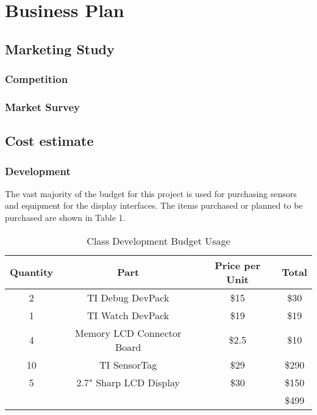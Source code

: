\documentclass[ppfs.tex]{template/subfiles}
\begin{document}
\section{Business Plan}
    \subsection{Marketing Study}
        \subsubsection{Competition}
        \subsubsection{Market Survey}
    \subsection{Cost estimate}
        \subsubsection{Development}
        The vast majority of the budget for this project is used for purchasing sensors and equipment for the display interfaces. The items purchased or planned to be purchased are shown in Table 1.
        \begin{table}[h!]
        	\begin{center}
        		\caption{Class Development Budget Usage}
        		\label{tab:table1}
        		\begin{tabular}{|c|c|c|c|}
        			\hline
        			Quantity & Part & Price per Unit & Total\\
        			\hline
        			2 & TI Debug DevPack & \$15 & \$30\\
        			\hline
        			1 & TI Watch DevPack & \$19 & \$19\\
        			\hline
        			4 & Memory LCD Connector Board & \$2.5 & \$10\\
        			\hline
        			10 & TI SensorTag & \$29 & \$290\\
        			\hline
        			5 & 2.7" Sharp LCD Display & \$30 & \$150\\
        			\hline
        			&&& \$499\\
        			\hline
        		\end{tabular}
        	\end{center}
        \end{table}
        
\end{document}
